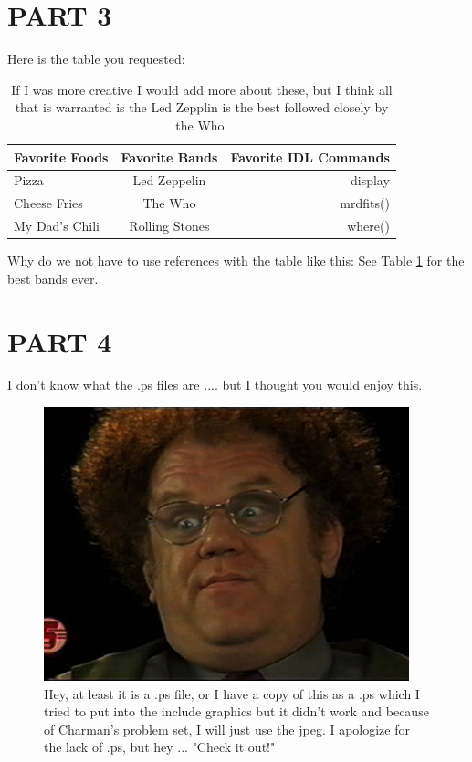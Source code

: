 \documentclass[12pt]{article}
\begin{document}
\section{PART 3}

Here is the table you requested:

\begin{table}[H]
  \centering
  \begin{tabular}{|l|c|r|}
    \hline
     Favorite Foods & Favorite Bands & Favorite IDL Commands \\
      \hline
   Pizza & Led Zeppelin & display \\
   Cheese Fries & The Who & mrdfits()  \\
   My Dad's Chili & Rolling Stones & where()  \\ \hline

 \end{tabular}
  \caption{If I was more creative I would add more about these, but I think all that is warranted is the Led Zepplin is the best followed closely by the Who.}
  \label{tab:favs}
\end{table}

Why do we not have to use references with the table like this: See Table \ref{tab:favs} for the best bands ever.

\section{PART 4}

I don't know what the .ps files are .... but I thought you would enjoy this.

\begin{figure}[H]
	\centering
        	\includegraphics[width = \linewidth]{What_I_Learned.jpg}
        	\caption{Hey, at least it is a .ps file, or I have a copy of this as a .ps which I tried to put into the include graphics but it didn't work and because of Charman's problem set, I will just use the jpeg. I apologize for the lack of .ps, but hey ... "Check it out!"}
        \label{fig:the1nonly} 
\end{figure}
\end{document}
